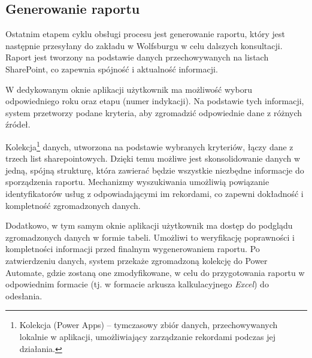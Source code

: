 \subsection{Generowanie raportu}
Ostatnim etapem cyklu obsługi procesu jest generowanie raportu, który jest następnie przesyłany do zakładu w Wolfsburgu w celu dalszych konsultacji. Raport jest tworzony na podstawie danych przechowywanych na listach SharePoint, co zapewnia spójność i aktualność informacji.

W dedykowanym oknie aplikacji użytkownik ma możliwość wyboru odpowiedniego roku oraz etapu (numer indykacji). Na podstawie tych informacji, system przetworzy podane kryteria, aby zgromadzić odpowiednie dane z różnych źródeł.

Kolekcja\footnote{Kolekcja (Power Apps) -- tymczasowy zbiór danych, przechowywanych lokalnie w aplikacji, umożliwiający zarządzanie rekordami podczas jej działania.} danych, utworzona na podstawie wybranych kryteriów, łączy dane z trzech list sharepointowych. Dzięki temu możliwe jest skonsolidowanie danych w jedną, spójną strukturę, która zawierać będzie wszystkie niezbędne informacje do sporządzenia raportu.  Mechanizmy wyszukiwania umożliwią powiązanie identyfikatorów usług z odpowiadającymi im rekordami, co zapewni dokładność i kompletność zgromadzonych danych.

Dodatkowo, w tym samym oknie aplikacji użytkownik ma dostęp do podglądu zgromadzonych danych w formie tabeli. Umożliwi to weryfikację poprawności i kompletności informacji przed finalnym wygenerowaniem raportu. Po zatwierdzeniu danych, system przekaże zgromadzoną kolekcję do Power Automate, gdzie zostaną one  zmodyfikowane, w celu do przygotowania raportu w odpowiednim formacie (tj. w formacie arkusza kalkulacyjnego \textit{Excel}) do odesłania.
